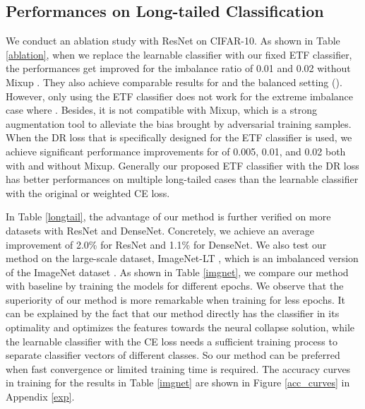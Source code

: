 \documentclass{article}
\newcommand{\<}{\left\langle}
\renewcommand{\>}{\right\rangle}
\begin{document}
\vspace{-1mm}
\subsection{Performances on Long-tailed Classification}

We conduct an ablation study with ResNet on CIFAR-10. As shown in Table \ref{ablation}, when we replace the learnable classifier with our fixed ETF classifier, the performances get improved for the imbalance ratio  of 0.01 and 0.02 without Mixup \cite{zhang2018mixup}. They also achieve comparable results for  and the balanced setting (). However, only using the ETF classifier does not work for the extreme imbalance case where . Besides, it is not compatible with Mixup, which is a strong augmentation tool to alleviate the bias brought by adversarial training samples. When the DR loss that is specifically designed for the ETF classifier is used, we achieve significant performance improvements for  of 0.005, 0.01, and 0.02 both with and without Mixup. Generally our proposed ETF classifier with the DR loss has better performances on multiple long-tailed cases than the learnable classifier with the original or weighted CE loss.  

In Table \ref{longtail}, the advantage of our method is further verified on more datasets with ResNet and DenseNet. Concretely, we achieve an average improvement of 2.0\% for ResNet and 1.1\% for DenseNet. We also test our method on the large-scale dataset, ImageNet-LT \cite{liu2019large}, which is an imbalanced version of the ImageNet dataset \cite{russakovsky2015imagenet}. As shown in Table \ref{imgnet}, we compare our method with baseline by training the models for different epochs. We observe that the superiority of our method is more remarkable when training for less epochs. It can be explained by the fact that our method directly has the classifier in its optimality and optimizes the features towards the neural collapse solution, while the learnable classifier with the CE loss needs a sufficient training process to separate classifier vectors of different classes. So our method can be preferred when fast convergence or limited training time is required. The accuracy curves in training for the results in Table \ref{imgnet} are shown in Figure \ref{acc_curves} in Appendix \ref{exp}.








\vspace{-2mm}
\end{document}
